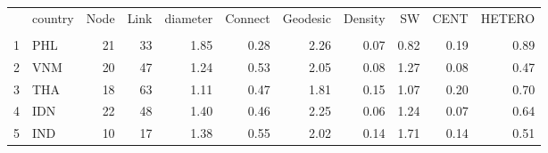 \begin{table}[ht]
\centering
\begin{tabular}{rlrrrrrrrrr}
  \hline
 & country & Node & Link & diameter & Connect & Geodesic & Density & SW & CENT & HETERO \\ 
 \\
  \hline
1 & PHL &  21 & 33 & 1.85 & 0.28 & 2.26 & 0.07 & 0.82 & 0.19 & 0.89 \\ 
  2 & VNM &  20 & 47 & 1.24 & 0.53 & 2.05 & 0.08 & 1.27 & 0.08 & 0.47 \\ 
  3 & THA &  18 & 63 & 1.11 & 0.47 & 1.81 & 0.15 & 1.07 & 0.20 & 0.70 \\ 
  4 & IDN &  22 & 48 & 1.40 & 0.46 & 2.25 & 0.06 & 1.24 & 0.07 & 0.64 \\ 
  5 & IND &  10 & 17 & 1.38 & 0.55 & 2.02 & 0.14 & 1.71 & 0.14 & 0.51 \\ 
   \hline
\end{tabular}
\end{table}
